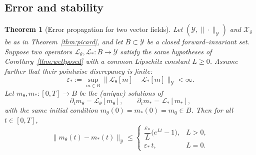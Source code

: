 \documentclass[11pt,a4paper]{article}
\theoremstyle{plain}
\newtheorem{theorem}{Theorem}[section]
\theoremstyle{definition}
\theoremstyle{remark}
\begin{document}
\subsection{Error and stability}
\begin{theorem}[Error propagation for two vector fields]\label{thm:err}
	Let $(\mathcal Y,\|\cdot\|_{\mathcal Y})$ and $\mathcal X_\delta$
	be as in Theorem~\ref{thm:picard}, and let $B\subset\mathcal Y$
	be a closed forward–invariant set.
	Suppose two operators
	\(\mathcal L_\theta,\mathcal L_*:B\to\mathcal Y\) satisfy
	the same hypotheses of Corollary~\ref{thm:wellposed}
	with a common Lipschitz constant $L\ge 0$.
	Assume further that their pointwise discrepancy is finite:
	\[
		\varepsilon_*:=\sup_{m\in B}
		\|\mathcal L_\theta[m]-\mathcal L_*[m]\|_{\mathcal Y}<\infty.
	\]
	Let $m_\theta,m_*:[0,T]\to B$ be the (unique) solutions of
	\[
		\partial_t m_\theta=\mathcal L_\theta[m_\theta],\qquad
		\partial_t m_*=\mathcal L_*[m_*],
	\]
	with the same initial condition $m_\theta(0)=m_*(0)=m_0\in B$.
	Then for all $t\in[0,T]$,
	\begin{equation}\label{eq:err-prop}
		\|m_\theta(t)-m_*(t)\|_{\mathcal Y}
		\le
		\begin{cases}
			\displaystyle \dfrac{\varepsilon_*}{L}\bigl(e^{Lt}-1\bigr), & L>0, \\[1ex]
			\displaystyle \varepsilon_*\, t,                            & L=0.
		\end{cases}
	\end{equation}
\end{theorem}
\end{document}
